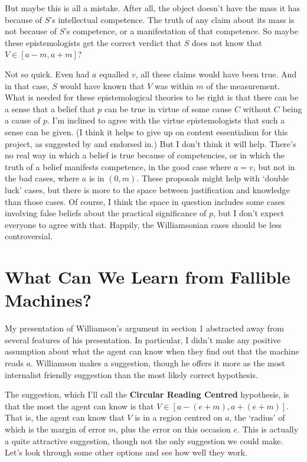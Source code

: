 But maybe this is all a mistake. After all, the object doesn't have the mass it has because of $S$'s intellectual competence. The truth of any claim about its mass is not because of $S$'s competence, or a manifestation of that competence. So maybe these epistemologists get the correct verdict that $S$ does not know that $V \in [a - m, a + m]$?

Not so quick. Even had $a$ equalled $v$, all these claims would have been true. And in that case, $S$ would have known that $V$ was within $m$ of the measurement. What is needed for these epistemological theories to be right is that there can be a sense that a belief that $p$ can be true in virtue of some cause $C$ without $C$ being a cause of $p$. I'm inclined to agree with the virtue epistemologists that such a sense can be given. (I think it helps to give up on content essentialism for this project, as suggested by \citet{David2002} and endorsed in\citet{Weatherson2004-WEALMT}.) But I don't think it will help. There's no real way in which a belief is true because of competencies, or in which the truth of a belief manifests competence, in the good case where $a = v$, but not in the bad cases, where $a$ is in $(0, m)$. These proposals might help with `double luck' cases, but there is more to the space between justification and knowledge than those cases. Of course, I think the space in question includes some cases involving false beliefs about the practical significance of $p$, but I don't expect everyone to agree with that. Happily, the Williamsonian cases should be less controversial.


\section{What Can We Learn from Fallible Machines?}
My presentation of Williamson's argument in section 1 abstracted away from several features of his presentation. In particular, I didn't make any positive assumption about what the agent can know when they find out that the machine reads $a$. Williamson makes a suggestion, though he offers it more as the most internalist friendly suggestion than the most likely correct hypothesis.

The suggestion, which I'll call the \textbf{Circular Reading Centred} hypothesis, is that the most the agent can know is that $V \in [a - (e + m), a + (e + m)]$. That is, the agent can know that $V$ is in a region centred on $a$, the `radius' of which is the margin of error $m$, plus the error on this occasion $e$. This is actually a quite attractive suggestion, though not the only suggestion we could make. Let's look through some other options and see how well they work.

